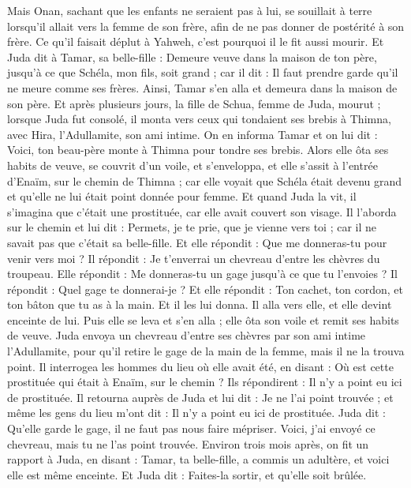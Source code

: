 \begin{multicols}{2}
Mais Onan, sachant que les enfants ne seraient pas à lui, se souillait à terre lorsqu'il allait vers la femme de son frère, afin de ne pas donner de postérité à son frère.
Ce qu'il faisait déplut à Yahweh, c'est pourquoi il le fit aussi mourir.
Et Juda dit à Tamar, sa belle-fille : Demeure veuve dans la maison de ton père, jusqu'à ce que Schéla, mon fils, soit grand ; car il dit : Il faut prendre garde qu'il ne meure comme ses frères. Ainsi, Tamar s'en alla et demeura dans la maison de son père.
Et après plusieurs jours, la fille de Schua, femme de Juda, mourut ; lorsque Juda fut consolé, il monta vers ceux qui tondaient ses brebis à Thimna, avec Hira, l'Adullamite, son ami intime.
On en informa Tamar et on lui dit : Voici, ton beau-père monte à Thimna pour tondre ses brebis.
Alors elle ôta ses habits de veuve, se couvrit d'un voile, et s'enveloppa, et elle s'assit à l'entrée d'Enaïm, sur le chemin de Thimna ; car elle voyait que Schéla était devenu grand et qu'elle ne lui était point donnée pour femme.
Et quand Juda la vit, il s'imagina que c'était une prostituée, car elle avait couvert son visage.
Il l'aborda sur le chemin et lui dit : Permets, je te prie, que je vienne vers toi ; car il ne savait pas que c'était sa belle-fille. Et elle répondit : Que me donneras-tu pour venir vers moi ?
Il répondit : Je t'enverrai un chevreau d'entre les chèvres du troupeau. Elle répondit : Me donneras-tu un gage jusqu'à ce que tu l'envoies ?
Il répondit : Quel gage te donnerai-je ? Et elle répondit : Ton cachet, ton cordon, et ton bâton que tu as à la main. Et il les lui donna. Il alla vers elle, et elle devint enceinte de lui.
Puis elle se leva et s'en alla ; elle ôta son voile et remit ses habits de veuve.
Juda envoya un chevreau d'entre ses chèvres par son ami intime l'Adullamite, pour qu'il retire le gage de la main de la femme, mais il ne la trouva point.
Il interrogea les hommes du lieu où elle avait été, en disant : Où est cette prostituée qui était à Enaïm, sur le chemin ? Ils répondirent : Il n'y a point eu ici de prostituée.
Il retourna auprès de Juda et lui dit : Je ne l'ai point trouvée ; et même les gens du lieu m'ont dit : Il n'y a point eu ici de prostituée.
Juda dit : Qu'elle garde le gage, il ne faut pas nous faire mépriser. Voici, j'ai envoyé ce chevreau, mais tu ne l'as point trouvée.
Environ trois mois après, on fit un rapport à Juda, en disant : Tamar, ta belle-fille, a commis un adultère, et voici elle est même enceinte. Et Juda dit : Faites-la sortir, et qu'elle soit brûlée.

\end{multicols}
